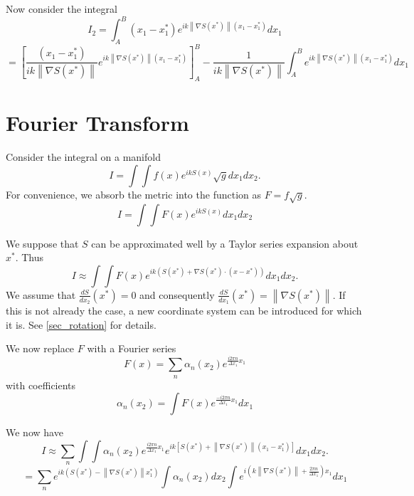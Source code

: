 \documentclass{article}
\newcommand{\norm}[1]{\left\lVert#1\right\rVert}
\theoremstyle{plain}
\begin{document}
Now consider the integral 
\begin{equation*}
	I_2 = \int_A^B (x_1-x_1^*) e^{ik\norm{\nabla S(x^*)}(x_1-x_1^*)} dx_1
\end{equation*}
\begin{equation}
	= \left[ \frac{(x_1-x_1^*)}{ik\norm{\nabla S(x^*)}} e^{ik\norm{\nabla S(x^*)}(x_1-x_1^*)} \right]_A^B
	- \frac{1}{ik\norm{\nabla S(x^*)}}\int_A^B e^{ik\norm{\nabla S(x^*)}(x_1-x_1^*)} dx_1
\end{equation}



\section{Fourier Transform}

Consider the integral on a manifold
\begin{equation}
	I = \int\int f(x) e^{ikS(x)} \sqrt{g} dx_1dx_2.
\end{equation}
For convenience, we absorb the metric into the function as  $F = f\sqrt{g}$.
\begin{equation}
	I = \int\int F(x) e^{ikS(x)} dx_1dx_2
\end{equation}



We suppose that $S$ can be approximated well by a Taylor series expansion about $x^*$.
Thus
\begin{equation}
	I \approx \int\int F(x) e^{ik\left(S(x^*) + \nabla S(x^*)\cdot (x-x^*) \right)} dx_1dx_2.
\end{equation}
We assume that $\frac{dS}{dx_2}(x^*) = 0$ and consequently $\frac{dS}{dx_1}(x^*) = \norm{\nabla S(x^*)}$.
If this is not already the case, a new coordinate system can be introduced for which it is. See \ref{sec_rotation} for details.


We now replace $F$ with a Fourier series
\begin{equation}
	F(x) = \sum_n \alpha_n(x_2) e^{ \frac{i2\pi n}{ \Delta x_1}x_1 }
\end{equation}
with coefficients
\begin{equation}
	\alpha_n(x_2) = \int F(x) e^{ \frac{-i2\pi n}{ \Delta x_1}x_1 } dx_1
\end{equation}


We now have
\begin{equation}
	I \approx \sum_n \int\int \alpha_n(x_2) e^{ \frac{i2\pi n}{ \Delta x_1 }x_1 }
	e^{ik\left[S(x^*) + \norm{\nabla S(x^*)}(x_1-x_1^*) \right]} dx_1dx_2.
\end{equation}
\begin{equation}
	= \sum_n e^{ik \left( S(x^*) - \norm{\nabla S(x^*)}x_1^* \right)} 
	\int \alpha_n(x_2) dx_2 
	\int e^{ i\left( k\norm{\nabla S(x^*)} + \frac{2\pi n}{ \Delta x_1 }\right) x_1 } dx_1
\end{equation}
\end{document}
